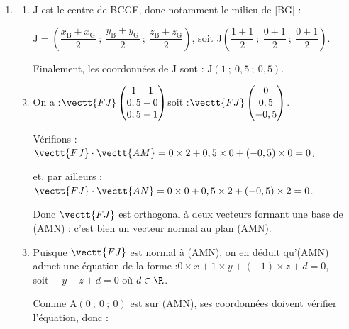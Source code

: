 \begin{enumerate}
\begin{enumerate}
			$\mathrm{AM} = \sqrt{2^2 + 0^2 + 0^2} = \sqrt{4} = 2$,\quad $\mathrm{AN} = \sqrt{0^2 + 2^2 + 2^2} = \sqrt{8} = 2\sqrt{2}$.

			Avec [AM] pour base, la hauteur correspondante est [AN] puisque le triangle est rectangle en A.

			On a donc :\quad $\mathcal{A}_{\mathrm{AMN}}= \dfrac{\mathrm{AM} \times \mathrm{AN}}{2} = \dfrac{2\times 2\sqrt{2}}{2} = 2\sqrt{2}$.
		\end{enumerate}

		\item
		\begin{enumerate}
			\item J est le centre de BCGF, donc notamment le milieu de [BG] :

			$\mathrm{J} = \left(\dfrac{x_\mathrm{B} + x_{\mathrm{G}}}{2} ~;~ \dfrac{y_\mathrm{B} + y_{\mathrm{G}}}{2} ~;~ \dfrac{z_\mathrm{B} + z_{\mathrm{G}}}{2}\right)$,
			\quad soit \quad J$\left(\dfrac{1 + 1}{2} ~;~ \dfrac{0 + 1}{2}~;~ \dfrac{0 + 1}{2}\right)$.

			Finalement, les coordonnées de J sont : \quad J$(1 ~;~ 0,5 ~;~ 0,5)$.

			\item On a :\quad $\vectt{FJ} \begin{pmatrix} 1 - 1\\0,5 - 0\\0,5 - 1 \end{pmatrix}$\quad soit :\quad $\vectt{FJ} \begin{pmatrix} 0\\0,5\\-0,5\end{pmatrix}$.

			Vérifions : \quad $\vectt{FJ} \cdot \vectt{AM} = 0 \times 2 + 0,5 \times 0 + (-0,5) \times 0 = 0$.

			et, par ailleurs :\quad $\vectt{FJ} \cdot \vectt{AN} = 0 \times 0 + 0,5 \times 2 + (-0,5) \times 2 = 0$.

			Donc $\vectt{FJ}$ est orthogonal à deux vecteurs formant une base de (AMN) : c'est bien un vecteur normal au plan (AMN).

			\item Puisque $\vectt{FJ}$ est normal à (AMN), on en déduit qu'(AMN) admet une équation de la forme :\quad $0\times x + 1\times y + (- 1)\times z + d = 0$,~~ soit ~~$y - z + d = 0$ \quad où $d \in \R$.

			Comme A$(0 ~;~ 0 ~;~ 0)$ est sur (AMN), ses coordonnées doivent vérifier l'équation, donc :


\end{enumerate}
\end{enumerate}
